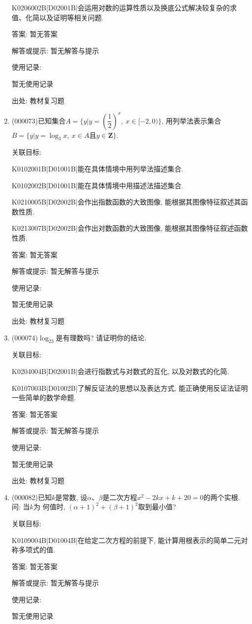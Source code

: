 \documentclass[10pt,a4paper]{article}
\begin{document}
\begin{enumerate}[1.]
K0206002B|D02001B|会运用对数的运算性质以及换底公式解决较复杂的求值、化简以及证明等相关问题.

答案: 暂无答案

解答或提示: 暂无解答与提示

使用记录:

暂无使用记录


出处: 教材复习题
\item { (000073)}已知集合$A=\{y|y=(\dfrac 12)^x,\  x\in [-2, 0)\}$, 用列举法表示集合$B=\{y|y=\log_3x,\  x\in A\text{且}y\in \mathbf{Z}\}$.


关联目标:

K0102001B|D01001B|能在具体情境中用列举法描述集合.

K0102002B|D01001B|能在具体情境中用描述法描述集合.

K0210005B|D02002B|会作出指数函数的大致图像, 能根据其图像特征叙述其函数性质.

K0213007B|D02002B|会作出对数函数的大致图像, 能根据其图像特征叙述函数性质.

答案: 暂无答案

解答或提示: 暂无解答与提示

使用记录:

暂无使用记录


出处: 教材复习题
\item { (000074)}$\log_23$是有理数吗? 请证明你的结论.


关联目标:

K0204004B|D02001B|会进行指数式与对数式的互化, 以及对数式的化简.

K0107003B|D01002B|了解反证法的思想以及表达方式, 能正确使用反证法证明一些简单的数学命题.

答案: 暂无答案

解答或提示: 暂无解答与提示

使用记录:

暂无使用记录


出处: 教材复习题
\item { (000082)}已知$k$是常数, 设$\alpha$、$\beta$是二次方程$x^2-2kx+k+20=0$的两个实根. 问: 当$k$为
何值时, $(\alpha+1)^2+(\beta+1)^2$取到最小值?


关联目标:

K0109004B|D01004B|在给定二次方程的前提下, 能计算用根表示的简单二元对称多项式的值.

答案: 暂无答案

解答或提示: 暂无解答与提示

使用记录:

暂无使用记录



\end{enumerate}
\end{document}

